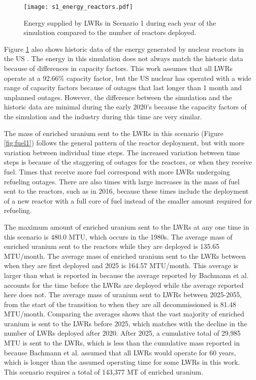 \begin{figure}
    \centering
    \texttt{[image: s1\_energy\_reactors.pdf]}
    \caption{Energy supplied by \glspl{LWR} in Scenario 1 during each year of
    the simulation compared to the number of reactors deployed.}
    \label{fig:energy_reactor1}
\end{figure}

Figure \ref{fig:energy_reactor1} also shows historic data of the 
energy generated by nuclear reactors in the US \cite{noauthor_total_2022}.
The energy in this simulation does not always match the historic data 
because of differences in capacity factors. This work assumes that all 
\glspl{LWR} operate at a 92.66\% capacity factor, but the US nuclear 
has operated with a wide range of capacity factors because of outages 
that last longer than 1 month and unplanned outages. However, 
the difference between the simulation and the historic data are minimal 
during the early 2020's because the capacity factors of the simulation 
and the industry during this time are very similar. 

The mass of enriched uranium sent to the \glspl{LWR} in this scenario (Figure 
\ref{fig:fuel1}) follows the general pattern of the reactor deployment, but with 
more variation between individual time steps. The increased variation between 
time steps is because of the staggering of outages for the reactors, or when 
they receive fuel. Times that receive more fuel correspond with more 
\glspl{LWR} undergoing refueling outages. There are also times with large 
increases in the mass of fuel 
sent to the reactors, such as in 2016, because these times include the deployment 
of a new reactor with a full core of fuel instead of the smaller amount 
required for refueling.

The maximum amount of enriched uranium sent to the \glspl{LWR} at any one 
time in this scenario is 480.0 MTU, which occurs in the 1980s. The 
average mass of enriched uranium sent to 
the reactors while they are deployed is 135.65 MTU/month. The average mass of 
enriched uranium sent to the \glspl{LWR} between when they are first deployed 
and 2025 is 164.57 MTU/month. This average is larger than what is reported in 
\cite{bachmann_enrichment_2021} because the average reported by 
Bachmann et al. accounts for the time before the \glspl{LWR} are  
deployed while the average reported here does not. The average mass of 
uranium sent to \glspl{LWR} between 2025-2055, from the start of the transition 
to when they are all decommissioned is 81.48 MTU/month. Comparing the averages 
shows that the vast majority of enriched uranium is sent to the \glspl{LWR} 
before 2025, which matches with the decline in the number of \glspl{LWR} 
deployed after 2020. After 2025, a cumulative total of 29,985 MTU is 
sent to the \glspl{LWR},
which is less than the cumulative mass reported in \cite{bachmann_enrichment_2021}
because Bachmann et al. assumed that all \glspl{LWR} would operate for 60 years, 
which is longer than the assumed operating time for some \glspl{LWR} in 
this work. This scenario requires a total of 143,377 MT of enriched uranium.


